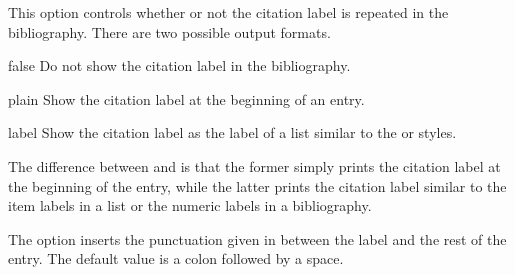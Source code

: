 \documentclass[DIV=9]{scrartcl}
\makeatletter
\def\textvisiblespace{%
  \raisebox{-2.2pt}{%
    \mbox{\kern.04em\vrule \@height.5ex \@width.12ex}%
    \vbox{\hrule \@width.2em \@height.12ex}%
    \hbox{\vrule \@height.5ex \@width.12ex}%
    \kern.04em}}
\newcommand*{\highlight}[2][1]{\textcolor{highlight#1}{#2}}
\makeatother
\begin{document}
\begin{optionlist}
This option controls whether or not the citation label is repeated in the
bibliography.
There are two possible output formats.
\begin{valuelist}
\item[false] Do not show the citation label in the bibliography.
\item[plain] Show the citation label at the beginning of an entry.
\item[label] Show the citation label as the label of a list similar to the
              or  styles.
\end{valuelist}

The difference between  and  is that the former simply
prints the citation label at the beginning of the entry, while the latter
prints the citation label similar to the item labels in a list or the numeric
labels in a  bibliography.

\begingroup
\togglefalse{bbx:doi}
\setlength{\introcitewidth}{5.8\biblabelsep}
\DeclareFieldFormat{bbx:introcite}{\highlight{#1}}
\renewcommand*{\introcitepunct}{\highlight{\addcolon}\space}
\makeatletter
\begin{bibexample}[title={\kvopt{introcite}{false}}]
\printbibliography[heading=none, category=introcite:opts]
\end{bibexample}

\begin{bibexample}[title={\kvopt{introcite}{plain}}]
\printbibliography[heading=none, category=introcite:opts]
\end{bibexample}

\begin{bibexample}[title={\kvopt{introcite}{label}}]
\printbibliography[heading=none, category=introcite:opts]
\end{bibexample}
\makeatother
\endgroup

\begin{ltxsyntax}
 The  option inserts the punctuation
given in  between the label and the rest of the entry.
The default value is a colon followed by a space.


\begin{bibexample}
\togglefalse{bbx:doi}
\renewcommand*{\introcitepunct}{\highlight{\textbf{\addcolon}\textvisiblespace}}
\printbibliography[heading=none, category=sigfridsson]
\end{bibexample}


\end{ltxsyntax}
\end{optionlist}
\end{document}
